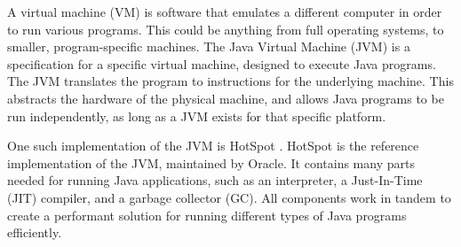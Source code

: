 A virtual machine (VM) is software that emulates a different computer in order to run various programs. This could be anything from full operating systems, to smaller, program-specific machines. The Java Virtual Machine (JVM) \cite{JVM} is a specification for a specific virtual machine, designed to execute Java programs. The JVM translates the program to instructions for the underlying machine. This abstracts the hardware of the physical machine, and allows Java programs to be run independently, as long as a JVM exists for that specific platform. 

One such implementation of the JVM is HotSpot \cite{hotspot}. HotSpot is the reference implementation of the JVM, maintained by Oracle. It contains many parts needed for running Java applications, such as an interpreter, a Just-In-Time (JIT) compiler, and a garbage collector (GC). All components work in tandem to create a performant solution for running different types of Java programs efficiently.
